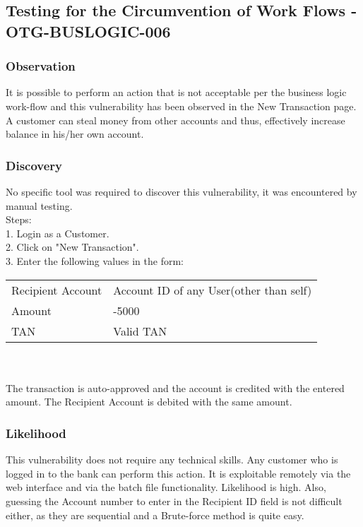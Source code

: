 \subsection{Testing for the Circumvention of Work Flows - OTG-BUSLOGIC-006}

\subsubsection{Observation}
It is possible to perform an action that is not acceptable per the business logic work-flow and this vulnerability has been observed in the New Transaction page.
A customer can steal money from other accounts and thus, effectively increase balance in his/her own account.

\subsubsection{Discovery}
No specific tool was required to discover this vulnerability, it was encountered by manual testing.\\
Steps: \\
1. Login as a Customer. \\
2. Click on "New Transaction". \\
3. Enter the following values in the form: \\

\begin{tabular}{l | l}
Recipient Account		& Account ID of any User(other than self) \\
Amount	& -5000 \\
TAN & Valid TAN
\end{tabular}
\\
\\
The transaction is auto-approved and the account is credited with the entered amount.
The Recipient Account is debited with the same amount.

\subsubsection{Likelihood}
This vulnerability does not require any technical skills.  Any customer who is logged in to the bank can perform this action. It is exploitable remotely via the
web interface and via the batch file functionality.
Likelihood is high.
Also, guessing the Account number to enter in the Recipient ID field is not difficult either, as they are sequential and a Brute-force method is quite easy.

